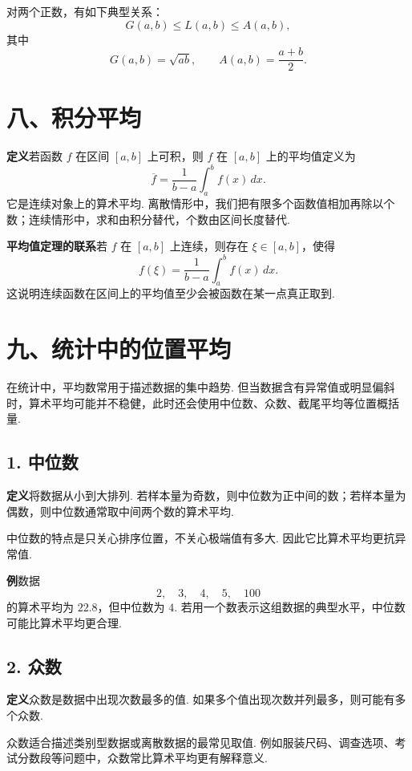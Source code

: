 \documentclass[UTF8, 12pt, fontset=fandol, oneside]{ctexart}
\begin{document}
对两个正数，有如下典型关系：
\[
  G(a,b)\le L(a,b)\le A(a,b),
\]
其中
\[
  G(a,b)=\sqrt{ab},\qquad A(a,b)=\frac{a+b}{2}.
\]

\section*{八、积分平均}

\noindent\textbf{定义}\quad 若函数 $f$ 在区间 $[a,b]$ 上可积，则 $f$ 在 $[a,b]$ 上的平均值定义为
\[
  \overline{f}
  =\frac{1}{b-a}\int_a^b f(x)\,dx.
\]
它是连续对象上的算术平均. 离散情形中，我们把有限多个函数值相加再除以个数；连续情形中，求和由积分替代，个数由区间长度替代.

\noindent\textbf{平均值定理的联系}\quad 若 $f$ 在 $[a,b]$ 上连续，则存在 $\xi\in[a,b]$，使得
\[
  f(\xi)=\frac{1}{b-a}\int_a^b f(x)\,dx.
\]
这说明连续函数在区间上的平均值至少会被函数在某一点真正取到.

\section*{九、统计中的位置平均}

在统计中，平均数常用于描述数据的集中趋势. 但当数据含有异常值或明显偏斜时，算术平均可能并不稳健，此时还会使用中位数、众数、截尾平均等位置概括量.

\subsection*{1. 中位数}

\noindent\textbf{定义}\quad 将数据从小到大排列. 若样本量为奇数，则中位数为正中间的数；若样本量为偶数，则中位数通常取中间两个数的算术平均.

中位数的特点是只关心排序位置，不关心极端值有多大. 因此它比算术平均更抗异常值.

\noindent\textbf{例}\quad 数据
\[
  2,\quad 3,\quad 4,\quad 5,\quad 100
\]
的算术平均为 $22.8$，但中位数为 $4$. 若用一个数表示这组数据的典型水平，中位数可能比算术平均更合理.

\subsection*{2. 众数}

\noindent\textbf{定义}\quad 众数是数据中出现次数最多的值. 如果多个值出现次数并列最多，则可能有多个众数.

众数适合描述类别型数据或离散数据的最常见取值. 例如服装尺码、调查选项、考试分数段等问题中，众数常比算术平均更有解释意义.
\end{document}
